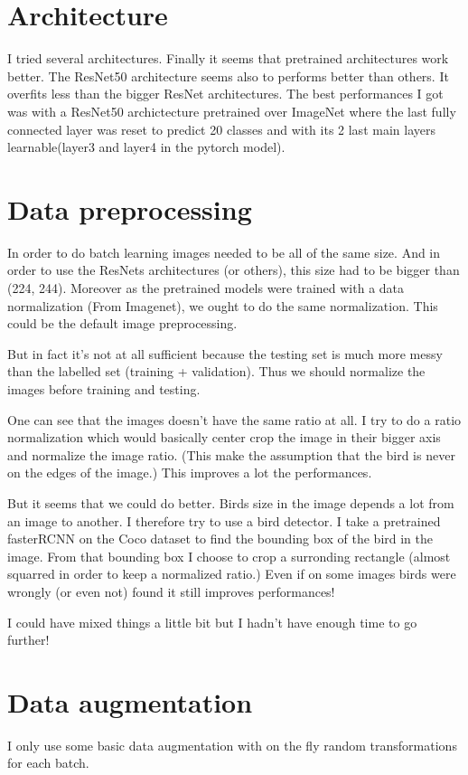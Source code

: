 \documentclass[final]{cvpr}
\begin{document}
\section{Architecture}
I tried several architectures. Finally it seems that pretrained architectures work better.
The ResNet50 architecture seems also to performs better than others. It overfits less than
the bigger ResNet architectures. The best performances I got was with a ResNet50 archictecture
pretrained over ImageNet where the last fully connected layer was reset to predict 20
classes and with its 2 last main layers learnable(layer3 and layer4 in the pytorch model).

\section{Data preprocessing}
In order to do batch learning images needed to be all of the same size. And in order to use
the ResNets architectures (or others), this size had to be bigger than (224, 244). Moreover
as the pretrained models were trained with a data normalization (From Imagenet), we ought
to do the same normalization. This could be the default image preprocessing.

But in fact it's not at all sufficient because the testing set is much more messy than the
labelled set (training + validation). Thus we should normalize the images before training
and testing.

One can see that the images doesn't have the same ratio at all. I try to do a ratio
normalization which would basically center crop the image in their bigger axis and normalize
the image ratio. (This make the assumption that the bird is never on the edges of the image.)
This improves a lot the performances.

But it seems that we could do better. Birds size in the image depends a lot from an image to
another. I therefore try to use a bird detector. I take a pretrained fasterRCNN on the Coco
dataset to find the bounding box of the bird in the image. From that bounding box I choose to
crop a surronding rectangle (almost squarred in order to keep a normalized ratio.) Even if on
some images birds were wrongly (or even not) found it still improves performances!

I could have mixed things a little bit but I hadn't have enough time to go further!

\section{Data augmentation}
I only use some basic data augmentation with on the fly random transformations for each batch.
\end{document}
